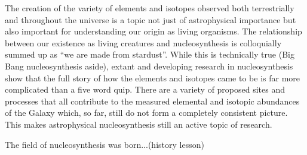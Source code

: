 The creation of the variety of elements and isotopes observed both terrestrially and throughout the universe is a topic not just of astrophysical importance but also important for understanding our origin as living organisms.  The relationship between our existence as living creatures and nucleosynthesis is colloquially summed up as ``we are made from stardust''.  While this is technically true (Big Bang nucleosynthesis aside), extant and developing research in nucleosynthesis show that the full story of how the elements and isotopes came to be is far more complicated than a five word quip.  There are a variety of proposed sites and processes that all contribute to the measured elemental and isotopic abundances of the Galaxy which, so far, still do not form a completely consistent picture.  This makes astrophysical nucleosynthesis still an active topic of research.

The field of nucleosynthesis was born...(history lesson)